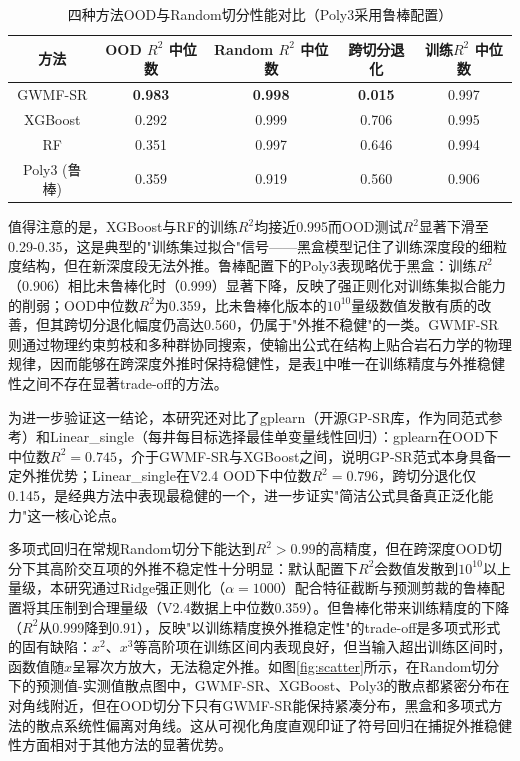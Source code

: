 \documentclass[a4paper,12pt]{ctexart}
\begin{document}
\begin{table}[htbp]
  \centering
  \caption{四种方法OOD与Random切分性能对比（Poly3采用鲁棒配置）}
  \label{tab:error_stats}
  \begin{tabular}{ccccc}
    \toprule
    方法 & OOD $R^2$ 中位数 & Random $R^2$ 中位数 & 跨切分退化 & 训练$R^2$ 中位数 \\
    \midrule
    GWMF-SR    & \textbf{0.983} & \textbf{0.998} & \textbf{0.015}  & 0.997 \\
    XGBoost    & 0.292 & 0.999 & 0.706  & 0.995 \\
    RF         & 0.351 & 0.997 & 0.646  & 0.994 \\
    Poly3 (鲁棒) & 0.359 & 0.919 & 0.560 & 0.906 \\
    \bottomrule
  \end{tabular}
\end{table}

值得注意的是，XGBoost与RF的训练$R^2$均接近0.995而OOD测试$R^2$显著下滑至0.29-0.35，这是典型的"训练集过拟合"信号——黑盒模型记住了训练深度段的细粒度结构，但在新深度段无法外推。鲁棒配置下的Poly3表现略优于黑盒：训练$R^2$（0.906）相比未鲁棒化时（0.999）显著下降，反映了强正则化对训练集拟合能力的削弱；OOD中位数$R^2$为0.359，比未鲁棒化版本的$10^{10}$量级数值发散有质的改善，但其跨切分退化幅度仍高达0.560，仍属于"外推不稳健"的一类。GWMF-SR则通过物理约束剪枝和多种群协同搜索，使输出公式在结构上贴合岩石力学的物理规律，因而能够在跨深度外推时保持稳健性，是表\ref{tab:error_stats}中唯一在训练精度与外推稳健性之间不存在显著trade-off的方法。

为进一步验证这一结论，本研究还对比了gplearn（开源GP-SR库，作为同范式参考）和Linear\_single（每井每目标选择最佳单变量线性回归）：gplearn在OOD下中位数$R^2=0.745$，介于GWMF-SR与XGBoost之间，说明GP-SR范式本身具备一定外推优势；Linear\_single在V2.4 OOD下中位数$R^2=0.796$，跨切分退化仅0.145，是经典方法中表现最稳健的一个，进一步证实"简洁公式具备真正泛化能力"这一核心论点。

多项式回归在常规Random切分下能达到$R^2 > 0.99$的高精度，但在跨深度OOD切分下其高阶交互项的外推不稳定性十分明显：默认配置下$R^2$会数值发散到$10^{10}$以上量级，本研究通过Ridge强正则化（$\alpha=1000$）配合特征截断与预测剪裁的鲁棒配置将其压制到合理量级（V2.4数据上中位数0.359）。但鲁棒化带来训练精度的下降（$R^2$从0.999降到0.91），反映"以训练精度换外推稳定性"的trade-off是多项式形式的固有缺陷：$x^2$、$x^3$等高阶项在训练区间内表现良好，但当输入超出训练区间时，函数值随$x$呈幂次方放大，无法稳定外推。如图\ref{fig:scatter}所示，在Random切分下的预测值-实测值散点图中，GWMF-SR、XGBoost、Poly3的散点都紧密分布在对角线附近，但在OOD切分下只有GWMF-SR能保持紧凑分布，黑盒和多项式方法的散点系统性偏离对角线。这从可视化角度直观印证了符号回归在捕捉外推稳健性方面相对于其他方法的显著优势。
\end{document}
